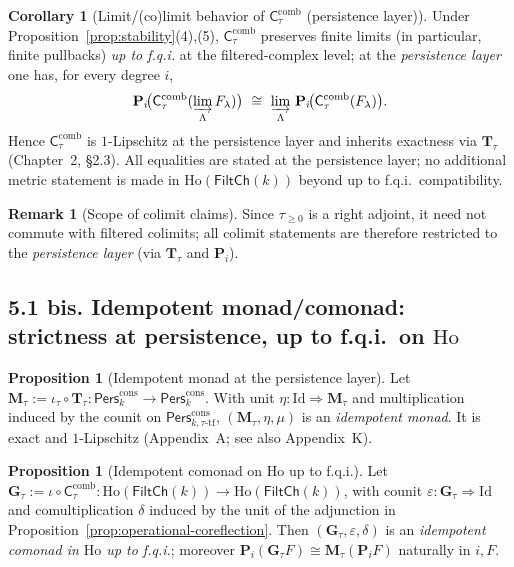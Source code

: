 \documentclass[11pt]{article}
\numberwithin{equation}{section}
\theoremstyle{plain}
\theoremstyle{definition}
\theoremstyle{remark}
\DeclareRobustCommand{\hyp}{\nobreakdash-}
\theoremstyle{plain}
\theoremstyle{definition}
\numberwithin{equation}{section}
\newtheorem{proposition}[theorem]{Proposition}
\newtheorem{corollary}[theorem]{Corollary}
\theoremstyle{definition}
\newtheorem{remark}[theorem]{Remark}
\numberwithin{equation}{section}
\theoremstyle{plain}
\theoremstyle{definition}
\theoremstyle{remark}
\begin{document}
\begin{corollary}[Limit/(co)limit behavior of $\mathsf{C}_\tau^{\mathrm{comb}}$ (persistence layer)]
Under Proposition~\ref{prop:stability}(4),(5), $\mathsf{C}_\tau^{\mathrm{comb}}$ preserves finite limits
(in particular, finite pullbacks) \emph{up to f.q.i.} at the filtered\hyp complex level; at the
\emph{persistence layer} one has, for every degree $i$,
\[
\mathbf{P}_i\!\big(\mathsf{C}_\tau^{\mathrm{comb}}(\varinjlim_\Lambda F_\lambda)\big)\ \cong\ \varinjlim_\Lambda\, \mathbf{P}_i\!\big(\mathsf{C}_\tau^{\mathrm{comb}}(F_\lambda)\big).
\]
Hence $\mathsf{C}_\tau^{\mathrm{comb}}$ is $1$-Lipschitz at the persistence layer and inherits exactness via $\mathbf{T}_\tau$ (Chapter~2, §2.3). All equalities are stated at the persistence layer; no additional metric statement is made in $\mathrm{Ho}(\mathsf{FiltCh}(k))$ beyond up to f.q.i.\ compatibility.
\end{corollary}

\begin{remark}[Scope of colimit claims]
Since $\tau_{\ge 0}$ is a right adjoint, it need not commute with filtered colimits; all colimit statements are therefore restricted to the \emph{persistence layer} (via $\mathbf{T}_\tau$ and $\mathbf{P}_i$).
\end{remark}

\subsection*{5.1 bis. Idempotent monad/comonad: strictness at persistence, up to f.q.i.\ on $\mathrm{Ho}$}

\begin{proposition}[Idempotent monad at the persistence layer]\label{prop:monad}
Let $\mathbf{M}_\tau:=\iota_\tau\circ \mathbf{T}_\tau:\mathsf{Pers}^{\mathrm{cons}}_k\to \mathsf{Pers}^{\mathrm{cons}}_k$. With unit $\eta:\mathrm{Id}\Rightarrow \mathbf{M}_\tau$ and multiplication induced by the counit on $\mathsf{Pers}^{\mathrm{cons}}_{k,\tau\text{-tf}}$, $(\mathbf{M}_\tau,\eta,\mu)$ is an \emph{idempotent monad}. It is exact and $1$-Lipschitz (Appendix~A; see also Appendix~K).
\end{proposition}

\begin{proposition}[Idempotent comonad on $\mathrm{Ho}$ up to f.q.i.]\label{prop:comonad}
Let $\mathbf{G}_\tau:=\iota\circ \mathsf{C}_\tau^{\mathrm{comb}}:\mathrm{Ho}(\mathsf{FiltCh}(k))\to \mathrm{Ho}(\mathsf{FiltCh}(k))$, with counit $\varepsilon:\mathbf{G}_\tau\Rightarrow \mathrm{Id}$ and comultiplication $\delta$ induced by the unit of the adjunction in Proposition~\ref{prop:operational-coreflection}. Then $(\mathbf{G}_\tau,\varepsilon,\delta)$ is an \emph{idempotent comonad in $\mathrm{Ho}$ up to f.q.i.}; moreover $\mathbf{P}_i(\mathbf{G}_\tau F)\cong \mathbf{M}_\tau(\mathbf{P}_iF)$ naturally in $i,F$.
\end{proposition}
\end{document}

